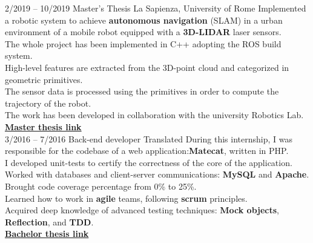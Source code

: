 \documentclass[9pt]{developercv} %
\begin{document}
\vspace{0.5cm}
\vspace{0.5cm}


\begin{entrylist}
	\entry
		{2/2019 -- 10/2019}
		{Master's Thesis}
		{La Sapienza, University of Rome}
		{
                Implemented a robotic system to achieve \textbf{autonomous navigation} (SLAM) in a urban environment of a mobile robot equipped with a \textbf{3D-LIDAR} laser sensors.\\
                The whole project has been implemented in C++ adopting the ROS build system.\\
                High-level features are extracted from the 3D-point cloud and categorized in geometric primitives.\\
                The sensor data is processed using the primitives in order to compute the trajectory of the robot.\\
                The work has been developed in collaboration with the university Robotics Lab.\\
                \href{https://github.com/dinies/MasterThesis-ArtificialIntelligence-Robotics/blob/master/MaterThesis_Edoardo_Ghini.pdf}{\textbf{Master thesis link}}\\
                }
	\entry
		{3/2016 -- 7/2016}
		{Back-end developer}
		{Translated}
                {
                  During this internship, I was responsible for the codebase of a web application:\textbf{Matecat}, written in PHP.\\
                  I developed unit-tests to certify the correctness of the core of the application.\\
                  Worked with databases and client-server communications: \textbf{MySQL} and \textbf{Apache}.\\
                  Brought code coverage percentage from 0\% to 25\%.\\
                  Learned how to work in \textbf{agile} teams, following \textbf{scrum} principles.\\
                  Acquired deep knowledge of advanced testing techniques: \textbf{Mock objects}, \textbf{Reflection}, and \textbf{TDD}.\\
                  \href{https://github.com/dinies/BachelorThesis/blob/master/EdoardoGhiniThesis.pdf}{\textbf{Bachelor thesis link}}\\
                }

\end{entrylist}
\end{document}
